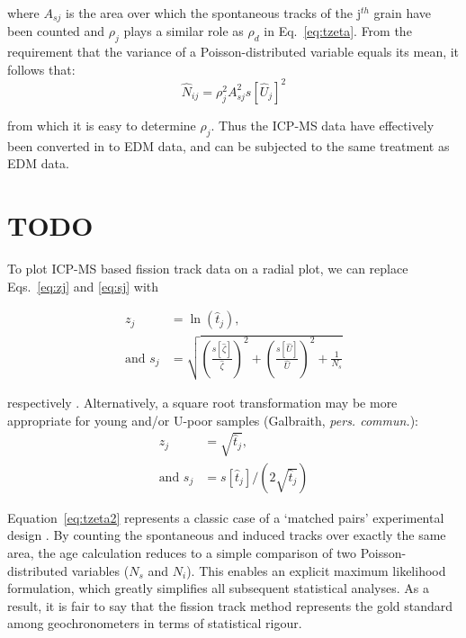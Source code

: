 \begin{refsection}
where $A_{sj}$ is the area over which the spontaneous tracks of the
j$^{th}$ grain have been counted and $\rho_j$ plays a similar role as
$\rho_d$ in Eq.~\ref{eq:tzeta}. From the requirement that the variance
of a Poisson-distributed variable equals its mean, it follows that:
\begin{equation}
\hat{N}_{ij} = \rho_j^2 A_{sj}^2 s[\hat{U}_j]^2
\end{equation}

\noindent from which it is easy to determine $\rho_j$. Thus the ICP-MS
data have effectively been converted in to EDM data, and can be
subjected to the same treatment as EDM data.

\section{TODO}

To plot ICP-MS based fission track data on a radial plot, we can
replace Eqs.~\ref{eq:zj} and \ref{eq:sj} with

\begin{align}
  z_j & = \ln (\hat{t}_j) \mbox{,}   \label{eq:zj2} \\
  \mbox{and~} s_j & = \sqrt{ 
    \left(\frac{s[\hat{\zeta}]}{\hat{\zeta}}\right)^2 +
    \left(\frac{s[\hat{U}]}{\hat{U}}\right)^2 +
    \frac{1}{N_s}
  }   \label{eq:sj2}
\end{align}

respectively \citep{galbraith2010b}. Alternatively, a square root
transformation may be more appropriate for young and/or U-poor samples
(Galbraith, \textit{pers. commun.}):
\begin{align}
  z_j & = \sqrt{\hat{t}_j} \mbox{,}   \label{eq:zj3} \\
  \mbox{and~} s_j & = s[\hat{t}_j]\bigg/\left(2\sqrt{\hat{t}_j}\right)
  \label{eq:sj3}
\end{align}


Equation~\ref{eq:tzeta2} represents a classic case of a `matched
pairs' experimental design \citep{galbraith2010}. By counting the
spontaneous and induced tracks over exactly the same area, the age
calculation reduces to a simple comparison of two Poisson-distributed
variables ($N_s$ and $N_i$). This enables an explicit maximum
likelihood formulation, which greatly simplifies all subsequent
statistical analyses. As a result, it is fair to say that the fission
track method represents the gold standard among geochronometers in
terms of statistical rigour.\\


\end{refsection}
